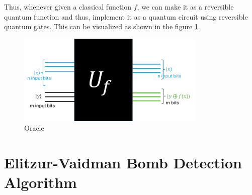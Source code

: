 \documentclass[12pt, oneside]{book}
\theoremstyle{definition}
\theoremstyle{definition}
\theoremstyle{remark}
\begin{document}
Thus, whenever given a classical function $f$, we can make it as a reversible quantum function and thus, implement
it as a quantum circuit using reversible quantum gates. This can be visualized as shown in the figure \ref{oracle}.
\begin{figure}[H]
    \centering
    \includegraphics[width=0.8\textwidth]{../images/oracle.png}
    \caption{Oracle}
    \label{oracle}
\end{figure}

\chapter{Elitzur-Vaidman Bomb Detection Algorithm}
\end{document}
